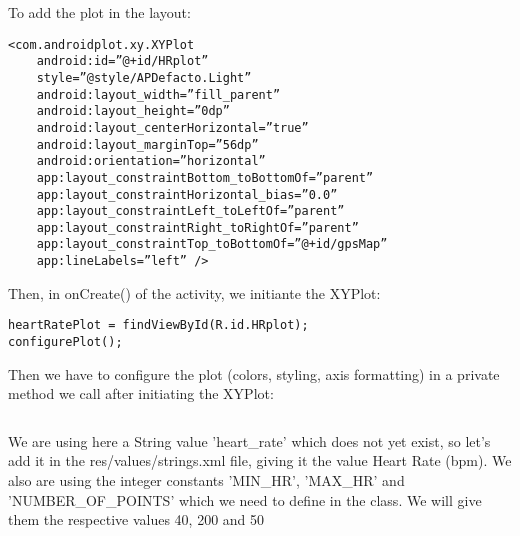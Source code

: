 \documentclass[11pt]{article}
\begin{document}
To add the plot in the layout:
\begin{lstlisting}
<com.androidplot.xy.XYPlot
    android:id=”@+id/HRplot”
    style=”@style/APDefacto.Light”
    android:layout_width=”fill_parent”
    android:layout_height=”0dp”
    android:layout_centerHorizontal=”true”
    android:layout_marginTop=”56dp”
    android:orientation=”horizontal”
    app:layout_constraintBottom_toBottomOf=”parent”
    app:layout_constraintHorizontal_bias=”0.0”
    app:layout_constraintLeft_toLeftOf=”parent”
    app:layout_constraintRight_toRightOf=”parent”
    app:layout_constraintTop_toBottomOf=”@+id/gpsMap”
    app:lineLabels=”left” />
\end{lstlisting}
Then, in onCreate() of the activity, we initiante the XYPlot:
\begin{lstlisting}
heartRatePlot = findViewById(R.id.HRplot);
configurePlot();
\end{lstlisting}
Then we have to configure the plot (colors, styling, axis formatting) in a private method we call after initiating the XYPlot:
\begin{lstlisting}

\end{lstlisting}
We are using here a String value 'heart_rate' which does not yet exist, so let’s add it in the res/values/strings.xml file, giving it the value Heart Rate (bpm). We also are using the integer constants 'MIN_HR', 'MAX_HR' and 'NUMBER_OF_POINTS' which we need to define in the class. We will give them the respective values 40, 200 and 50
\end{document}
